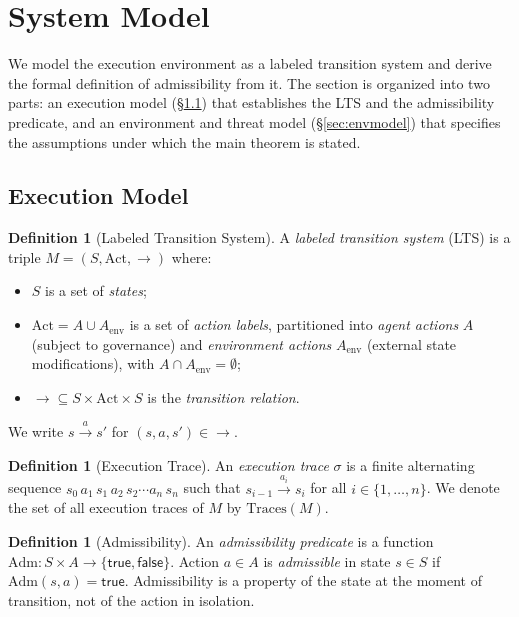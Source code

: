 \documentclass[11pt]{article}
\theoremstyle{plain}
\theoremstyle{definition}
\newtheorem{definition}[theorem]{Definition}
\theoremstyle{remark}
\newcommand{\Adm}{\mathrm{Adm}}
\newcommand{\Traces}{\mathrm{Traces}}
\begin{document}
\section{System Model}
\label{sec:model}

We model the execution environment as a labeled transition system and derive
the formal definition of admissibility from it.  The section is organized into
two parts: an execution model (\S\ref{sec:execmodel}) that establishes the LTS
and the admissibility predicate, and an environment and threat model
(\S\ref{sec:envmodel}) that specifies the assumptions under which the main
theorem is stated.

\subsection{Execution Model}
\label{sec:execmodel}

\begin{definition}[Labeled Transition System]
\label{def:lts}
A \emph{labeled transition system} (LTS) is a triple $M = (S, \mathrm{Act}, {\to})$ where:
\begin{itemize}
  \item $S$ is a set of \emph{states};
  \item $\mathrm{Act} = A \cup A_{\mathrm{env}}$ is a set of \emph{action labels},
    partitioned into \emph{agent actions} $A$ (subject to governance) and
    \emph{environment actions} $A_{\mathrm{env}}$ (external state modifications),
    with $A \cap A_{\mathrm{env}} = \emptyset$;
  \item ${\to} \subseteq S \times \mathrm{Act} \times S$ is the
    \emph{transition relation}.
\end{itemize}
We write $s \xrightarrow{a} s'$ for $(s, a, s') \in {\to}$.
\end{definition}

\begin{definition}[Execution Trace]
\label{def:trace}
An \emph{execution trace} $\sigma$ is a finite alternating sequence
$s_0\, a_1\, s_1\, a_2\, s_2 \cdots a_n\, s_n$
such that $s_{i-1} \xrightarrow{a_i} s_i$ for all $i \in \{1, \ldots, n\}$.
We denote the set of all execution traces of $M$ by $\Traces(M)$.
\end{definition}

\begin{definition}[Admissibility]
\label{def:adm}
An \emph{admissibility predicate} is a function
$\Adm : S \times A \to \{\mathsf{true}, \mathsf{false}\}$.
Action $a \in A$ is \emph{admissible} in state $s \in S$ if $\Adm(s, a) = \mathsf{true}$.
Admissibility is a property of the state at the moment of transition, not of
the action in isolation.
\end{definition}
\end{document}
